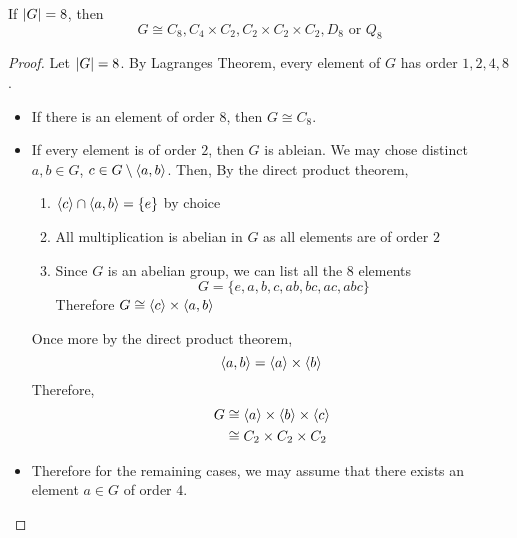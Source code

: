 \documentclass{article}
\begin{document}
\begin{lemma}
    If $\left\lvert G\right\rvert = 8$, then
    \[
        G \cong C_8, C_4 \times C_2, C_2 \times C_2 \times C_2, D_8 \text{ or } Q_8
    \]
\end{lemma}
\begin{proof}
    Let $\left\lvert G\right\rvert = 8$. By Lagranges Theorem, every element of $G$ has order $1, 2, 4, 8$.
    \begin{itemize}
        \item If there is an element of order $8$, then $G \cong C_8$.
        \item If every element is of order $2$, then $G$ is ableian.
        We may chose distinct $a, b \in G$, $c \in G \setminus \left\langle a, b\right\rangle$. Then,
        By the direct product theorem,
        \begin{enumerate}
            \item $\left\langle c\right\rangle \cap \left\langle a, b\right\rangle = \{ e \}$ by choice
            \item All multiplication is abelian in $G$ as all elements are of order $2$
            \item Since $G$ is an abelian group, we can list all the $8$ elements
            \[
                G = \{e, a, b, c, ab, bc, ac, abc\}  
            \]
            Therefore $G \cong \left\langle c\right\rangle \times \left\langle a, b\right\rangle$
        \end{enumerate}
        Once more by the direct product theorem,
        \[
            \left\langle a, b\right\rangle = \left\langle a\right\rangle \times \left\langle b\right\rangle
        \]
        Therefore,
        \begin{align*}
            G &\cong \left\langle a\right\rangle \times \left\langle b\right\rangle \times \left\langle c\right\rangle \\
            &\cong C_2 \times C_2 \times C_2 
        \end{align*}
        \item Therefore for the remaining cases, we may assume that there exists an element $a \in G$ of order $4$.
    \end{itemize}



\end{proof}
\end{document}
